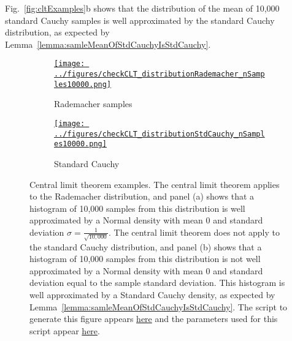 \documentclass[12pt]{article}
\def\fig_width{3.5in}
\begin{document}
\begin{appendices}
Fig.~\ref{fig:cltExamples}b shows that the distribution of the mean of 10,000
standard Cauchy samples is well approximated by the standard Cauchy
distribution, as expected by Lemma~\ref{lemma:samleMeanOfStdCauchyIsStdCauchy}.

\begin{figure}[H]
    \begin{center}

        \begin{subfigure}{1.0\textwidth}
            \centering
            \href{https://www.gatsby.ucl.ac.uk/~rapela/neuroinformatics/2023/ws1/figures/checkCLT_distributionRademacher_nSamples10000.html}{\texttt{[image: ../figures/checkCLT\_distributionRademacher\_nSamples10000.png]}}

            \caption{Rademacher samples}

            \label{fig:cltExamples_1}
        \end{subfigure}

        \begin{subfigure}{1.0\textwidth}
            \centering
            \href{https://www.gatsby.ucl.ac.uk/~rapela/neuroinformatics/2023/ws1/figures/checkCLT_distributionStdCauchy_nSamples10000.html}{\texttt{[image: ../figures/checkCLT\_distributionStdCauchy\_nSamples10000.png]}}

            \caption{Standard Cauchy}

            \label{fig:cltExamples_2}
        \end{subfigure}

        \caption{Central limit theorem examples. The central limit theorem
        applies to the Rademacher distribution, and panel (a) shows that a
        histogram of 10,000 samples from this distribution is well
        approximated by a Normal density with mean 0 and standard deviation
        $\sigma=\frac{1}{\sqrt{10,000}}$. The central limit theorem does not
        apply to the standard Cauchy distribution, and panel (b) shows that a
        histogram of 10,000 samples from this distribution is not well
        approximated by a Normal density with mean 0 and standard deviation
        equal to the sample standard deviation. This histogram is well
        approximated by a Standard Cauchy density, as expected by
        Lemma~\ref{lemma:samleMeanOfStdCauchyIsStdCauchy}.
        The script to generate this figure appears
        \href{https://github.com/joacorapela/neuroinformatics23/blob/master/worksheets/ws1/mySolution/code/scripts/doCheckCLT.py}{here}
        and the parameters used for this script appear
        \href{https://github.com/joacorapela/neuroinformatics23/blob/master/worksheets/ws1/mySolution/code/scripts/doCheckCLT.csh}{here}.
        }


\end{center}
\end{figure}
\end{appendices}
\end{document}
